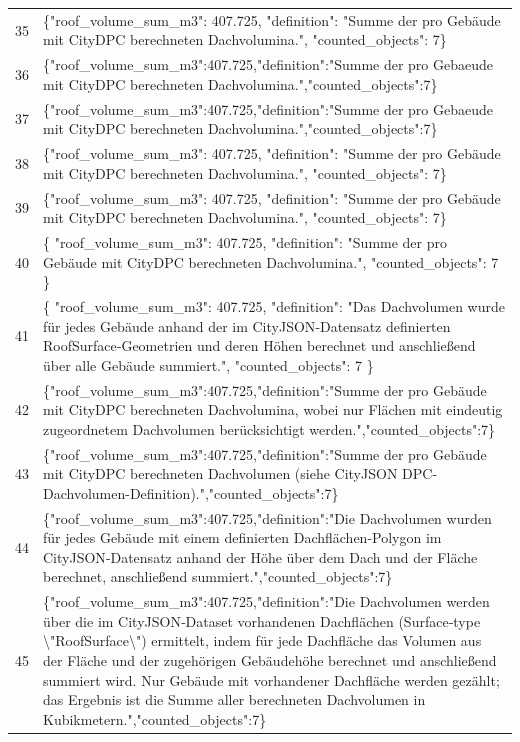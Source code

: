 \documentclass[a4paper,11pt]{article}
\begin{document}
\begin{table}[ht]
\begin{tabular}{r p{12cm}}
35 & \{"roof\_volume\_sum\_m3": 407.725, "definition": "Summe der pro Gebäude mit CityDPC berechneten Dachvolumina.", "counted\_objects": 7\} \\
36 & \{"roof\_volume\_sum\_m3":407.725,"definition":"Summe der pro Gebaeude mit CityDPC berechneten Dachvolumina.","counted\_objects":7\} \\
37 & \{"roof\_volume\_sum\_m3":407.725,"definition":"Summe der pro Gebaeude mit CityDPC berechneten Dachvolumina.","counted\_objects":7\} \\
38 & \{"roof\_volume\_sum\_m3": 407.725, "definition": "Summe der pro Gebäude mit CityDPC berechneten Dachvolumina.", "counted\_objects": 7\} \\
39 & \{"roof\_volume\_sum\_m3": 407.725, "definition": "Summe der pro Gebäude mit CityDPC berechneten Dachvolumina.", "counted\_objects": 7\} \\
40 & \{
  "roof\_volume\_sum\_m3": 407.725,
  "definition": "Summe der pro Gebäude mit CityDPC berechneten Dachvolumina.",
  "counted\_objects": 7
\} \\
41 & \{
  "roof\_volume\_sum\_m3": 407.725,
  "definition": "Das Dachvolumen wurde für jedes Gebäude anhand der im CityJSON‑Datensatz definierten RoofSurface‑Geometrien und deren Höhen berechnet und anschließend über alle Gebäude summiert.",
  "counted\_objects": 7
\} \\
42 & \{"roof\_volume\_sum\_m3":407.725,"definition":"Summe der pro Gebäude mit CityDPC berechneten Dachvolumina, wobei nur Flächen mit eindeutig zugeordnetem Dachvolumen berücksichtigt werden.","counted\_objects":7\} \\
43 & \{"roof\_volume\_sum\_m3":407.725,"definition":"Summe der pro Gebäude mit CityDPC berechneten Dachvolumen (siehe CityJSON DPC-Dachvolumen-Definition).","counted\_objects":7\} \\
44 & \{"roof\_volume\_sum\_m3":407.725,"definition":"Die Dachvolumen wurden für jedes Gebäude mit einem definierten Dachflächen-Polygon im CityJSON‑Datensatz anhand der Höhe über dem Dach und der Fläche berechnet, anschließend summiert.","counted\_objects":7\} \\
45 & \{"roof\_volume\_sum\_m3":407.725,"definition":"Die Dachvolumen werden über die im CityJSON‑Dataset vorhandenen Dachflächen (Surface‑type \textbackslash"RoofSurface\textbackslash") ermittelt, indem für jede Dachfläche das Volumen aus der Fläche und der zugehörigen Gebäudehöhe berechnet und anschließend summiert wird. Nur Gebäude mit vorhandener Dachfläche werden gezählt; das Ergebnis ist die Summe aller berechneten Dachvolumen in Kubikmetern.","counted\_objects":7\} \\

\end{tabular}
\end{table}
\end{document}
